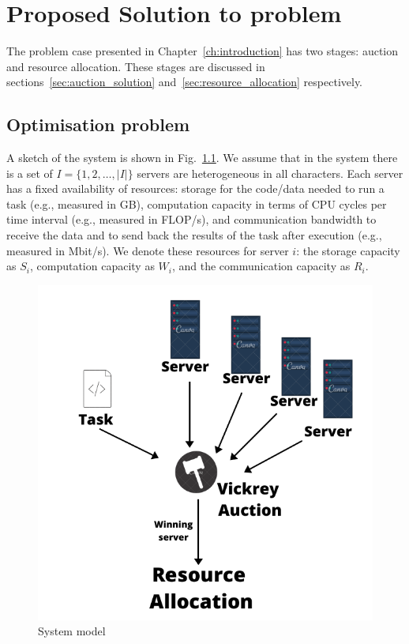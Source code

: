 \chapter{Proposed Solution to problem}\label{ch:proposed-solution-to-problem}
The problem case presented in Chapter~\ref{ch:introduction} has two stages: auction and resource allocation.
These stages are discussed in sections~\ref{sec:auction_solution} and~\ref{sec:resource_allocation}
respectively.

\section{Optimisation problem}\label{sec:optimisation-problem}
A sketch of the system is shown in Fig.~\ref{fig:system_model}.
We assume that in the system there is a set of $I = \{1,2,\ldots,\left|I\right|\}$ servers are heterogeneous in all
characters. Each server has a fixed availability of resources: storage for the code/data needed to run a task
(e.g., measured in GB), computation capacity in terms of CPU cycles per time interval (e.g., measured in FLOP/s),
and communication bandwidth to receive the data and to send back the results of the task after execution (e.g., measured in Mbit/s).
We denote these resources for server $i$: the storage capacity as $S_i$, computation capacity as $W_i$, and the communication capacity as $R_i$.

\begin{figure}
    \centering
    \includegraphics{extra/system_model.pdf}
    \caption{System model}
    \label{fig:system_model}
\end{figure}

